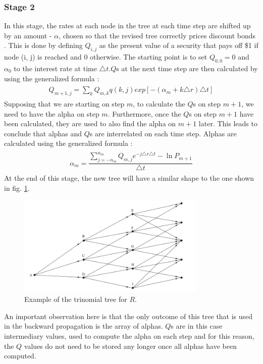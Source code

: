 \subsubsection*{Stage 2}
In this stage, the rates at each node in the tree at each time step are shifted up by an amount - $\alpha$, chosen so that the revised tree correctly prices discount bonds \cite[pg. 6]{uhwirt}. This is done by defining $Q_{i,j}$ as the present value of a security that pays off \$1 if node (i, j) is reached and 0 otherwise. The starting point is to set $Q_{0,0}=0$ and $\alpha_0$ to the interest rate at time $\triangle t$.$Q$s at the next time step are then calculated by using the generalized formula \cite[pg.705]{ofod}:  
\begin{equation}
\begin{gathered}
\begin{aligned}
Q_{m+1, j} = \sum_k Q_{m,k}q(k,j)exp[-(\alpha_m+k\triangle r)\triangle t]
\nonumber
\end{aligned}
\end{gathered}
\end{equation}
Supposing that we are starting on step $m$, to calculate the $Q$s on step $m+1$, we need to have the alpha on step $m$. Furthermore, once the $Q$s on step $m+1$ have been calculated, they are used to also find the alpha on $m+1$ later. This leads to conclude that alphas and $Q$s are interrelated on each time step. Alphas are calculated using the generalized formula \cite[pg.703]{ofod}:
\begin{equation}
\begin{gathered}
\begin{aligned}
\alpha_{m} = \dfrac{\sum_{j=-n_m}^{n_m} Q_{m,j}e^{-j\triangle r\triangle t} - \ln{P_{m + 1}}}{\triangle t}
\nonumber
\end{aligned}
\end{gathered}
\end{equation}
At the end of this stage, the new tree will have a similar shape to the one shown in fig. \ref{fig:treeconststage2}. 
\begin{figure}[H]
	\centering
	\includegraphics[width=0.8\textwidth]{img/treeconststage2.png}
	\caption{Example of the trinomial tree for $R$.}
	\label{fig:treeconststage2}
\end{figure}
An important observation here is that the only outcome of this tree that is used in the backward propagation is the array of alphas. $Q$s are in this case intermediary values, used to compute the alpha on each step and for this reason, the $Q$ values do not need to be stored any longer once all alphas have been computed. 
